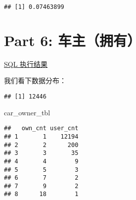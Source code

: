 \documentclass[]{article}
\newenvironment{Shaded}{\begin{snugshade}}{\end{snugshade}}
\newcommand{\KeywordTok}[1]{\textcolor[rgb]{0.13,0.29,0.53}{\textbf{#1}}}
\newcommand{\DataTypeTok}[1]{\textcolor[rgb]{0.13,0.29,0.53}{#1}}
\newcommand{\DecValTok}[1]{\textcolor[rgb]{0.00,0.00,0.81}{#1}}
\newcommand{\CharTok}[1]{\textcolor[rgb]{0.31,0.60,0.02}{#1}}
\newcommand{\StringTok}[1]{\textcolor[rgb]{0.31,0.60,0.02}{#1}}
\newcommand{\OtherTok}[1]{\textcolor[rgb]{0.56,0.35,0.01}{#1}}
\newcommand{\OperatorTok}[1]{\textcolor[rgb]{0.81,0.36,0.00}{\textbf{#1}}}
\newcommand{\NormalTok}[1]{#1}
\begin{document}
\begin{verbatim}
## [1] 0.07463899
\end{verbatim}

\section{Part 6: 车主（拥有）}\label{part-6-}

\href{https://data.bytedance.net/aeolus/\#/queryEditor/query/45f906f434cdb80e?group=default\&blockId=1829312\&taskId=6512711}{SQL
执行结果}

\begin{Shaded}
\end{Shaded}

我们看下数据分布：

\begin{Shaded}
\end{Shaded}

\begin{verbatim}
## [1] 12446
\end{verbatim}

\begin{Shaded}
\begin{Highlighting}[]
\NormalTok{car_owner_tbl}
\end{Highlighting}
\end{Shaded}

\begin{verbatim}
##   own_cnt user_cnt
## 1       1    12194
## 2       2      200
## 3       3       35
## 4       4        9
## 5       5        3
## 6       7        2
## 7       9        2
## 8      18        1
\end{verbatim}
\end{document}
